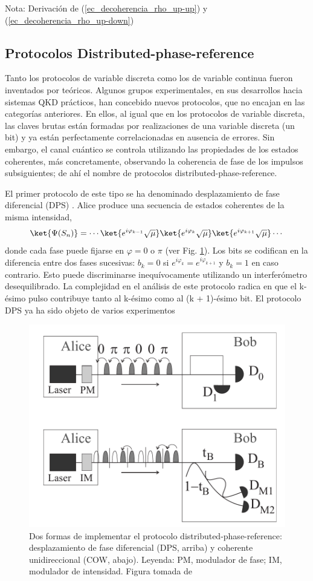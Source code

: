 \documentclass[a4paper,11pt]{book} %
\numberwithin{equation}{chapter}
\begin{document}
\begin{mybox_blue}{Nota: Derivación de (\ref{ec_decoherencia_rho_up-up}) y  (\ref{ec_decoherencia_rho_up-down})}
		\subsection{Protocolos Distributed-phase-reference} \label{subsec_QKD_phase}
		
Tanto los protocolos de variable discreta como los de variable continua fueron inventados por teóricos. Algunos grupos experimentales, en sus desarrollos hacia sistemas QKD prácticos, han concebido nuevos protocolos, que no encajan en las categorías anteriores. En ellos, al igual que en los protocolos de variable discreta, las claves brutas están formadas por realizaciones de una variable discreta (un bit) y ya están perfectamente correlacionadas en ausencia de errores. Sin embargo, el canal cuántico se controla utilizando las propiedades de los estados coherentes, más concretamente, observando la coherencia de fase de los impulsos subsiguientes; de ahí el nombre de protocolos distributed-phase-reference.

El primer protocolo de este tipo se ha denominado desplazamiento de fase diferencial (DPS) \cite{Phase_Inoue_2002,Phase_Inoue_2003}. Alice produce una secuencia de estados coherentes de la misma intensidad,
	\begin{equation}
	\ket{ \Psi (S_n)} = \cdots \ket{e^{i \varphi_{k-1}} \sqrt{\mu}} \ket{e^{i \varphi_k} \sqrt{\mu}} \ket{e^{i \varphi_{k+1}} \sqrt{\mu}} \cdots
	\end{equation}
donde cada fase puede fijarse en $\varphi = 0$ o $\pi$ (ver Fig. \ref{Fig_QKD_DFR}). Los bits se codifican en la diferencia entre dos fases sucesivas: $b_k = 0$ si $e^{i \varphi_k} = e^{i \varphi_{k+1}}$ y $b_k = 1$ en caso contrario. Esto puede discriminarse inequívocamente utilizando un interferómetro desequilibrado. La complejidad en el análisis de este protocolo radica en que el k-ésimo pulso contribuye tanto al k-ésimo como al (k + 1)-ésimo bit. El protocolo DPS ya ha sido objeto de varios experimentos \cite{QKD_DFR_Takesue_2005,QKD_DFR_Takesue_2007,QKD_DFR_Diamanti_2006}

	\begin{figure}[t]
	\centering 
	\includegraphics[width=0.6\linewidth]{Figuras/Fig_QKD_DFR.png}
	\caption{Dos formas de implementar el protocolo distributed-phase-reference: desplazamiento de fase diferencial (DPS, arriba) y coherente unidireccional (COW, abajo). Leyenda: PM, modulador de fase; IM, modulador de intensidad. Figura tomada de \cite{QKD_resumen}}
	\label{Fig_QKD_DFR}
	\end{figure}


\end{mybox_blue}
\end{document}
